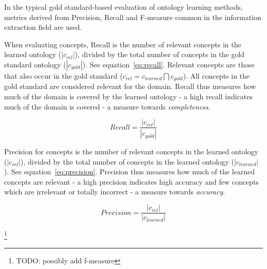 \documentclass[a4paper]{report}
\newcommand{\todo}[1]{\footnote{{\color{red} TODO: #1}}}
\begin{document}
In the typical gold standard-based evaluation of ontology learning methods, metrics derived from Precision, Recall and F-measure common in the information extraction field are used\cite{Wong11Survey}.

When evaluating concepts, Recall is the number of relevant concepts in the learned ontology (\(|c_{rel}|\)), divided by the total number of concepts in the gold standard ontology (\(|c_{gold}|\))\cite{Dellschaft08EvalStrateg}.
See equation~\ref{eq:recall}.
Relevant concepts are those that also occur in the gold standard (\(c_{rel} = c_{learned} \bigcap c_{gold}\)).
All concepts in the gold standard are considered relevant for the domain.
Recall thus measures how much of the domain is covered by the learned ontology - a high recall indicates much of the domain is covered - a measure towards \emph{completeness}.

\begin{equation}
\label{eq:recall}
 Recall = \frac{|c_{rel}|}{|c_{gold}|}
\end{equation}

Precision for concepts is the number of relevant concepts in the learned ontology (\(|c_{rel}|\)), divided by the total number of concepts in the learned ontology (\(|c_{learned}|\))\cite{Dellschaft08EvalStrateg}.
See equation~\ref{eq:precision}.
Precision thus measures how much of the learned concepts are relevant - a high precision indicates high accuracy and few concepts which are irrelevant or totally incorrect - a measure towards \emph{accuracy}.

\begin{equation}
\label{eq:precision}
 Precision = \frac{|c_{rel}|}{|c_{learned}|}
\end{equation}

\todo{possibly add f-measure}
\end{document}
